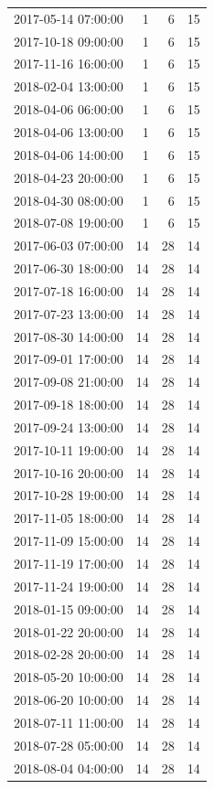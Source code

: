 \begin{tabular}{lrrr}
2017-05-14 07:00:00 & 1 & 6 & 15 \\
2017-10-18 09:00:00 & 1 & 6 & 15 \\
2017-11-16 16:00:00 & 1 & 6 & 15 \\
2018-02-04 13:00:00 & 1 & 6 & 15 \\
2018-04-06 06:00:00 & 1 & 6 & 15 \\
2018-04-06 13:00:00 & 1 & 6 & 15 \\
2018-04-06 14:00:00 & 1 & 6 & 15 \\
2018-04-23 20:00:00 & 1 & 6 & 15 \\
2018-04-30 08:00:00 & 1 & 6 & 15 \\
2018-07-08 19:00:00 & 1 & 6 & 15 \\
2017-06-03 07:00:00 & 14 & 28 & 14 \\
2017-06-30 18:00:00 & 14 & 28 & 14 \\
2017-07-18 16:00:00 & 14 & 28 & 14 \\
2017-07-23 13:00:00 & 14 & 28 & 14 \\
2017-08-30 14:00:00 & 14 & 28 & 14 \\
2017-09-01 17:00:00 & 14 & 28 & 14 \\
2017-09-08 21:00:00 & 14 & 28 & 14 \\
2017-09-18 18:00:00 & 14 & 28 & 14 \\
2017-09-24 13:00:00 & 14 & 28 & 14 \\
2017-10-11 19:00:00 & 14 & 28 & 14 \\
2017-10-16 20:00:00 & 14 & 28 & 14 \\
2017-10-28 19:00:00 & 14 & 28 & 14 \\
2017-11-05 18:00:00 & 14 & 28 & 14 \\
2017-11-09 15:00:00 & 14 & 28 & 14 \\
2017-11-19 17:00:00 & 14 & 28 & 14 \\
2017-11-24 19:00:00 & 14 & 28 & 14 \\
2018-01-15 09:00:00 & 14 & 28 & 14 \\
2018-01-22 20:00:00 & 14 & 28 & 14 \\
2018-02-28 20:00:00 & 14 & 28 & 14 \\
2018-05-20 10:00:00 & 14 & 28 & 14 \\
2018-06-20 10:00:00 & 14 & 28 & 14 \\
2018-07-11 11:00:00 & 14 & 28 & 14 \\
2018-07-28 05:00:00 & 14 & 28 & 14 \\
2018-08-04 04:00:00 & 14 & 28 & 14 \\

\end{tabular}
